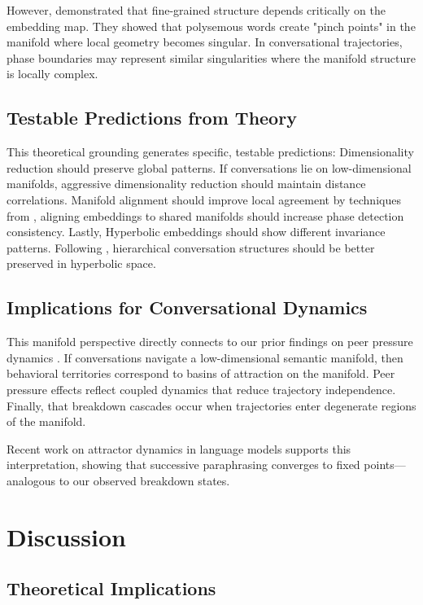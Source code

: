 \documentclass[11pt,letterpaper]{article}
\begin{document}
However, \citet{jakubowski2020topology} demonstrated that fine-grained structure depends critically on the embedding map. They showed that polysemous words create "pinch points" in the manifold where local geometry becomes singular. In conversational trajectories, phase boundaries may represent similar singularities where the manifold structure is locally complex.

\subsection{Testable Predictions from Theory}

This theoretical grounding generates specific, testable predictions: Dimensionality reduction should preserve global patterns. If conversations lie on low-dimensional manifolds, aggressive dimensionality reduction should maintain distance correlations. Manifold alignment should improve local agreement by techniques from \citet{hasan2017manifold}, aligning embeddings to shared manifolds should increase phase detection consistency. Lastly, Hyperbolic embeddings should show different invariance patterns. Following \citet{chen2024hypformer}, hierarchical conversation structures should be better preserved in hyperbolic space.

\subsection{Implications for Conversational Dynamics}

This manifold perspective directly connects to our prior findings on peer pressure dynamics \citep{garcia2025peer}. If conversations navigate a low-dimensional semantic manifold, then behavioral territories correspond to basins of attraction on the manifold. Peer pressure effects reflect coupled dynamics that reduce trajectory independence. Finally, that breakdown cascades occur when trajectories enter degenerate regions of the manifold.

Recent work on attractor dynamics in language models \citep{wang2025attractor} supports this interpretation, showing that successive paraphrasing converges to fixed points—analogous to our observed breakdown states.

\section{Discussion}

\subsection{Theoretical Implications}
\end{document}
